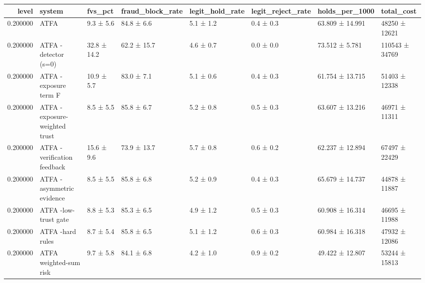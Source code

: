 \begin{tabular}{rlllllll}
\toprule
level & system & fvs\_pct & fraud\_block\_rate & legit\_hold\_rate & legit\_reject\_rate & holds\_per\_1000 & total\_cost \\
\midrule
0.200000 & ATFA & 9.3 ± 5.6 & 84.8 ± 6.6 & 5.1 ± 1.2 & 0.4 ± 0.3 & 63.809 ± 14.991 & 48250 ± 12621 \\
0.200000 & ATFA -detector (s=0) & 32.8 ± 14.2 & 62.2 ± 15.7 & 4.6 ± 0.7 & 0.0 ± 0.0 & 73.512 ± 5.781 & 110543 ± 34769 \\
0.200000 & ATFA -exposure term F & 10.9 ± 5.7 & 83.0 ± 7.1 & 5.1 ± 0.6 & 0.4 ± 0.3 & 61.754 ± 13.715 & 51403 ± 12338 \\
0.200000 & ATFA -exposure-weighted trust & 8.5 ± 5.5 & 85.8 ± 6.7 & 5.2 ± 0.8 & 0.5 ± 0.3 & 63.607 ± 13.216 & 46971 ± 11311 \\
0.200000 & ATFA -verification feedback & 15.6 ± 9.6 & 73.9 ± 13.7 & 5.7 ± 0.8 & 0.6 ± 0.2 & 62.237 ± 12.894 & 67497 ± 22429 \\
0.200000 & ATFA -asymmetric evidence & 8.5 ± 5.5 & 85.8 ± 6.8 & 5.2 ± 0.9 & 0.4 ± 0.3 & 65.679 ± 14.737 & 44878 ± 11887 \\
0.200000 & ATFA -low-trust gate & 8.8 ± 5.3 & 85.3 ± 6.5 & 4.9 ± 1.2 & 0.5 ± 0.3 & 60.908 ± 16.314 & 46695 ± 11988 \\
0.200000 & ATFA -hard rules & 8.7 ± 5.4 & 85.8 ± 6.5 & 5.1 ± 1.2 & 0.6 ± 0.3 & 60.984 ± 16.318 & 47932 ± 12086 \\
0.200000 & ATFA weighted-sum risk & 9.7 ± 5.8 & 84.1 ± 6.8 & 4.2 ± 1.0 & 0.9 ± 0.2 & 49.422 ± 12.807 & 53244 ± 15813 \\
\bottomrule
\end{tabular}
